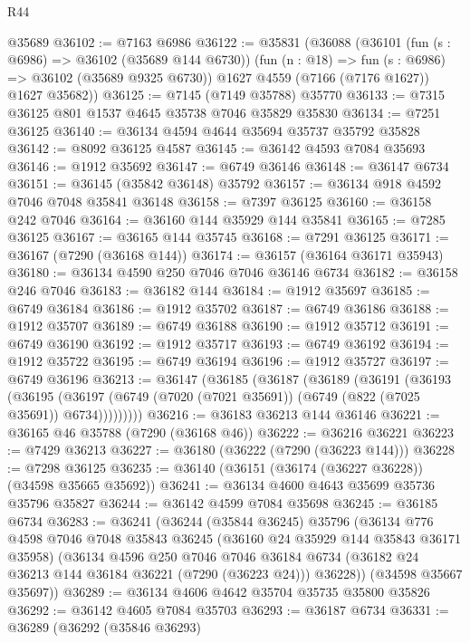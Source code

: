 \begin{lexlean}{R44}
\begin{coremodule}
{    @35689
@36102 := @7163 @6986
@36122 := @35831
    (@36088
      (@36101
        (fun (s : @6986) => @36102 (@35689 @144 @6730))
        (fun (n : @18) => fun (s : @6986) => @36102 (@35689 @9325 @6730))
        @1627
        @4559
        (@7166 (@7176 @1627))
        @1627
        @35682))
@36125 := @7145 (@7149 @35788) @35770
@36133 := @7315 @36125 @801 @1537 @4645 @35738 @7046 @35829 @35830
@36134 := @7251 @36125
@36140 := @36134 @4594 @4644 @35694 @35737 @35792 @35828
@36142 := @8092 @36125 @4587
@36145 := @36142 @4593 @7084 @35693
@36146 := @1912 @35692
@36147 := @6749 @36146
@36148 := @36147 @6734
@36151 := @36145 (@35842 @36148) @35792
@36157 := @36134 @918 @4592 @7046 @7048 @35841 @36148
@36158 := @7397 @36125
@36160 := @36158 @242 @7046
@36164 := @36160 @144 @35929 @144 @35841
@36165 := @7285 @36125
@36167 := @36165 @144 @35745
@36168 := @7291 @36125
@36171 := @36167 (@7290 (@36168 @144))
@36174 := @36157 (@36164 @36171 @35943)
@36180 := @36134 @4590 @250 @7046 @7046 @36146 @6734
@36182 := @36158 @246 @7046
@36183 := @36182 @144
@36184 := @1912 @35697
@36185 := @6749 @36184
@36186 := @1912 @35702
@36187 := @6749 @36186
@36188 := @1912 @35707
@36189 := @6749 @36188
@36190 := @1912 @35712
@36191 := @6749 @36190
@36192 := @1912 @35717
@36193 := @6749 @36192
@36194 := @1912 @35722
@36195 := @6749 @36194
@36196 := @1912 @35727
@36197 := @6749 @36196
@36213 := @36147
    (@36185
      (@36187
        (@36189
          (@36191
            (@36193
              (@36195
                (@36197 (@6749 (@7020 (@7021 @35691)) (@6749 (@822 (@7025 @35691)) @6734)))))))))
@36216 := @36183 @36213 @144 @36146
@36221 := @36165 @46 @35788 (@7290 (@36168 @46))
@36222 := @36216 @36221
@36223 := @7429 @36213
@36227 := @36180 (@36222 (@7290 (@36223 @144)))
@36228 := @7298 @36125
@36235 := @36140 (@36151 (@36174 (@36227 @36228)) (@34598 @35665 @35692))
@36241 := @36134 @4600 @4643 @35699 @35736 @35796 @35827
@36244 := @36142 @4599 @7084 @35698
@36245 := @36185 @6734
@36283 := @36241
    (@36244
      (@35844 @36245)
      @35796
      (@36134
        @776
        @4598
        @7046
        @7048
        @35843
        @36245
        (@36160 @24 @35929 @144 @35843 @36171 @35958)
        (@36134
          @4596
          @250
          @7046
          @7046
          @36184
          @6734
          (@36182 @24 @36213 @144 @36184 @36221 (@7290 (@36223 @24)))
          @36228))
      (@34598 @35667 @35697))
@36289 := @36134 @4606 @4642 @35704 @35735 @35800 @35826
@36292 := @36142 @4605 @7084 @35703
@36293 := @36187 @6734
@36331 := @36289
    (@36292
      (@35846 @36293)
}
\end{coremodule}
\end{lexlean}

